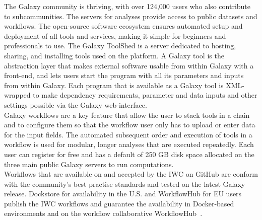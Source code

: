 The Galaxy community is thriving, with over 124,000 users who also contribute to subcommunities. The servers for analyses provide access to public datasets and workflows. The open-source software ecosystem ensures automated setup and deployment of all tools and services, making it simple for beginners and professionals to use. The Galaxy ToolShed is a server dedicated to hosting, sharing, and installing tools used on the platform. A Galaxy tool is the abstraction layer that makes external software usable from within Galaxy with a front-end, and lets users start the program with all its parameters and inputs from within Galaxy. Each program that is available as a Galaxy tool is XML-wrapped to make dependency requirements, parameter and data inputs and other settings possible via the Galaxy web-interface. \\ 
Galaxy workflows are a key feature that allow the user to stack tools in a chain and to configure them so that the workflow user only has to upload or enter data for the input fields. The automated subsequent order and execution of tools in a workflow is used for modular, longer analyses that are executed repeatedly. Each user can register for free and has a default of 250 GB disk space allocated on the three main public Galaxy servers to run computations. \\
Workflows that are available on and accepted by the \ac{IWC} on GitHub are conform with the community's best practise standards and tested on the latest Galaxy release. Dockstore for availability in the U.S. and WorkflowHub for EU users publish the \ac{IWC} workflows and guarantee the availability in Docker-based environments and on the workflow collaborative WorkflowHub~\cite{o2017dockstore, goble2021implementing}.

